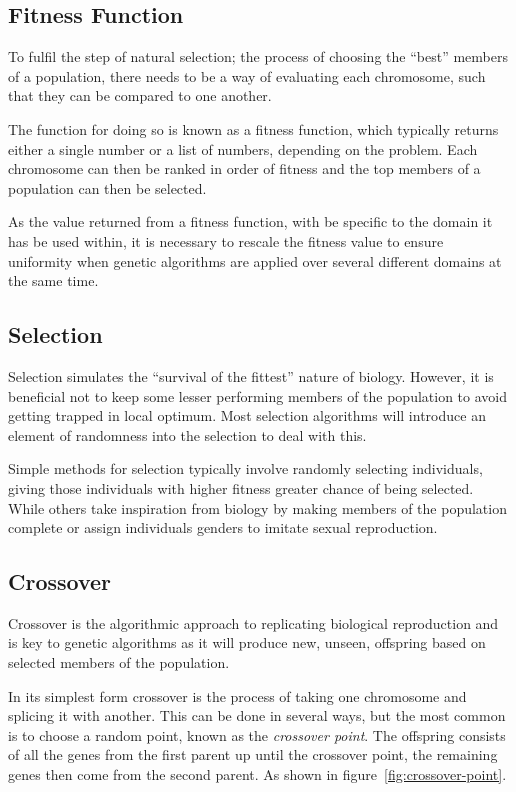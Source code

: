 \documentclass[10pt, a4paper]{article}
\begin{document}
\subsection{Fitness Function}
To fulfil the step of natural selection; the process of choosing the ``best''
members of a population, there needs to be a way of evaluating each chromosome,
such that they can be compared to one another.

The function for doing so is known as a fitness function, which typically 
returns either a single number or a list of numbers, depending on the problem.
Each chromosome can then be ranked in order of fitness and the top members of
a population can then be selected.

As the value returned from a fitness function, with be specific to the domain 
it has be used within, it is necessary to rescale the fitness value to ensure 
uniformity when genetic algorithms are applied over several different domains
at the same time. %


\subsection{Selection}
Selection simulates the ``survival of the fittest'' nature of biology. However,
it is beneficial not to keep some lesser performing members of the population
to avoid getting trapped in local optimum. Most selection algorithms will 
introduce an element of randomness into the selection to deal with this.

Simple methods for selection typically involve randomly selecting individuals,
giving those individuals with higher fitness greater chance of being selected.
While others take inspiration from biology by making members of the population
complete or assign individuals genders to imitate sexual reproduction.

\subsection{Crossover}

Crossover is the algorithmic approach to replicating biological reproduction
and is key to genetic algorithms as it will produce new, unseen, offspring
based on selected members of the population.

In its simplest form crossover is the process of taking one chromosome and
splicing it with another. This can be done in several ways, but the most common
is to choose a random point, known as the \textit{crossover point}. The
offspring consists of all the genes from the first parent up until the 
crossover point, the remaining genes then come from the second parent. As shown
in figure~\ref{fig:crossover-point}.
\end{document}
